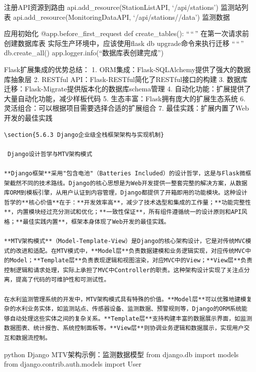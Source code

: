  注册API资源到路由 api.add\_resource(StationListAPI, `/api/stations')  监测站列表 api.add\_resource(MonitoringDataAPI, `/api/stations//data')  监测数据

 应用初始化 @app.before\_first\_request def create\_tables(): ``\,``\,'' 在第一次请求前创建数据库表 实际生产环境中，应该使用flask db upgrade命令来执行迁移 ``\,``\,'' db.create\_all() app.logger.info(``数据库表创建完成'')

 Flask扩展集成的优势总结：  1. ORM集成：Flask-SQLAlchemy提供了强大的数据库抽象层  2. RESTful API：Flask-RESTful简化了RESTful接口的构建  3. 数据库迁移：Flask-Migrate提供版本化的数据库schema管理  4. 自动化功能：扩展提供了大量自动化功能，减少样板代码  5. 生态丰富：Flask拥有庞大的扩展生态系统  6. 灵活组合：可以根据项目需要选择合适的扩展组合  7. 最佳实践：扩展内置了Web开发的最佳实践

\begin{lstlisting}
\section{5.6.3 Django企业级全栈框架架构与实现机制}

 Django设计哲学与MTV架构模式

**Django框架**采用"包含电池"（Batteries Included）的设计哲学，这是与Flask微框架截然不同的技术路线。Django的核心思想是为Web开发提供一整套完整的解决方案，从数据库ORM到模板引擎，从用户认证到内容管理，Django都提供了开箱即用的功能模块。这种设计哲学的**核心价值**在于：**开发效率高**，减少了技术选型和集成的工作量；**功能完整性**，内置模块经过充分测试和优化；**一致性保证**，所有组件遵循统一的设计原则和API风格；**最佳实践内置**，框架本身体现了Web开发的最佳实践。

**MTV架构模式**（Model-Template-View）是Django的核心架构设计，它是对传统MVC模式的改进和适配。在MTV模式中，**Model层**负责数据建模和业务逻辑实现，对应传统MVC中的Model；**Template层**负责表现逻辑和视图渲染，对应MVC中的View；**View层**负责控制逻辑和请求处理，实际上承担了MVC中Controller的职责。这种架构设计实现了关注点分离，提高了代码的可维护性和可测试性。

在水利监测管理系统的开发中，MTV架构模式具有特殊的价值。**Model层**可以优雅地建模复杂的水利业务实体，如监测站点、传感器设备、监测数据、预警规则等，Django的ORM系统能够自动处理这些实体之间的复杂关系。**Template层**支持构建丰富的数据展示界面，如监测数据图表、统计报告、系统控制面板等。**View层**则协调业务逻辑和数据展示，实现用户交互和数据流控制。
\end{lstlisting}

python  Django MTV架构示例：监测数据模型 from django.db import models from django.contrib.auth.models import User

